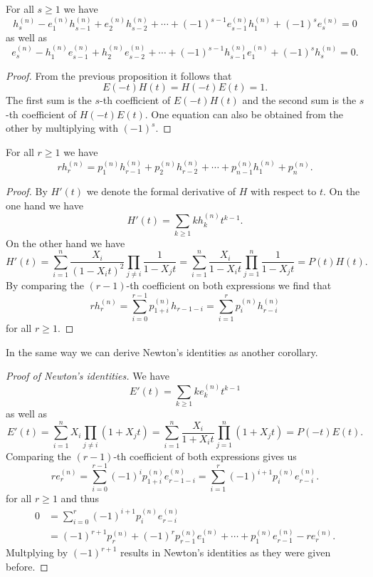 \begin{cor}
 For all $s \geq 1$ we have
 \[
  h^{(n)}_s - e^{(n)}_1 h^{(n)}_{s-1} + e^{(n)}_2 h^{(n)}_{s-2} + \dotsb + (-1)^{s-1} e^{(n)}_{s-1} h^{(n)}_1 + (-1)^s e^{(n)}_s = 0
 \]
 as well as
 \[
  e^{(n)}_s - h^{(n)}_1 e^{(n)}_{s-1} + h^{(n)}_2 e^{(n)}_{s-2} + \dotsb + (-1)^{s-1} h^{(n)}_{s-1} e^{(n)}_1 + (-1)^s h^{(n)}_s = 0.
 \]
\end{cor}
\begin{proof}
 From the previous proposition it follows that
 \[
  E(-t)H(t) = H(-t)E(t) = 1.
 \]
 The first sum is the $s$-th coefficient of $E(-t)H(t)$ and the second sum is the $s$-th coefficient of $H(-t)E(t)$. One equation can also be obtained from the other by multiplying with $(-1)^s$.
\end{proof}


\begin{cor}
 For all $r \geq 1$ we have
 \[
  r h^{(n)}_r = p^{(n)}_1 h^{(n)}_{r-1} + p^{(n)}_2 h^{(n)}_{r-2} + \dotsb + p^{(n)}_{n-1} h^{(n)}_1 + p^{(n)}_n.
 \]
\end{cor}
\begin{proof}
 By $H'(t)$ we denote the formal derivative of $H$ with respect to $t$. On the one hand we have
 \[
  H'(t) = \sum_{k \geq 1} k h^{(n)}_k t^{k-1}.
 \]
 On the other hand we have
 \[
  H'(t) = \sum_{i=1}^n \frac{X_i}{(1-X_i t)^2} \prod_{j \neq i} \frac{1}{1 - X_j t}
  = \sum_{i=1}^n \frac{X_i}{1 - X_i t} \prod_{j=1}^n \frac{1}{1 - X_j t}
  = P(t) H(t).
 \]
 By comparing the $(r-1)$-th coefficient on both expressions we find that
 \[
  r h^{(n)}_r = \sum_{i=0}^{r-1} p^{(n)}_{1+i} h_{r-1-i} = \sum_{i=1}^r p^{(n)}_i h^{(n)}_{r-i}
 \]
 for all $r \geq 1$.
\end{proof}


In the same way we can derive Newton’s identities as another corollary.


\begin{proof}[Proof of Newton’s identities]
 We have
 \[
  E'(t) = \sum_{k \geq 1} k e^{(n)}_k t^{k-1}
 \]
 as well as
 \[
  E'(t)
  = \sum_{i=1}^n X_i \prod_{j \neq i} (1 + X_j t)
  = \sum_{i=1}^n \frac{X_i}{1 + X_i t} \prod_{j=1}^n (1 + X_j t)
  = P(-t)E(t).
 \]
 Comparing the $(r-1)$-th coefficient of both expressions gives us
 \[
  r e^{(n)}_r
  = \sum_{i=0}^{r-1} (-1)^i p^{(n)}_{1+i} e^{(n)}_{r-1-i}
  = \sum_{i=1}^r (-1)^{i+1} p^{(n)}_i e^{(n)}_{r-i}.
 \]
 for all $r \geq 1$ and thus
 \begin{align*}
  0
  &= \sum_{i=0}^r (-1)^{i+1} p^{(n)}_i e^{(n)}_{r-i} \\
  &= (-1)^{r+1} p^{(n)}_r + (-1)^r p^{(n)}_{r-1} e^{(n)}_1 + \dotsb + p^{(n)}_1 e^{(n)}_{r-1} - r e^{(n)}_r.
 \end{align*}
 Multplying by $(-1)^{r+1}$ results in Newton’s identities as they were given before.
\end{proof}




